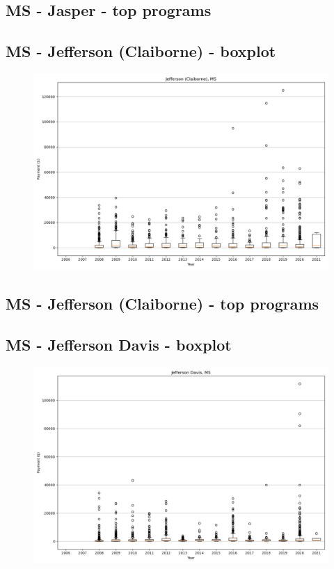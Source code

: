 \subsection*{MS - Jasper - top programs}

\newpage
\subsection*{MS - Jefferson (Claiborne) - boxplot}
\begin{figure}[h]
\centering
\includegraphics[width=7in]{../output/boxplots/counties/Jefferson (Claiborne)-MS_boxplot.png}
\end{figure}


\subsection*{MS - Jefferson (Claiborne) - top programs}

\newpage
\subsection*{MS - Jefferson Davis - boxplot}
\begin{figure}[h]
\centering
\includegraphics[width=7in]{../output/boxplots/counties/Jefferson Davis-MS_boxplot.png}
\end{figure}


